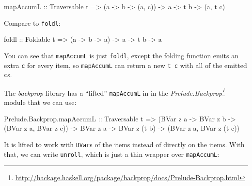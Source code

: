 \documentclass[]{article}
\newenvironment{Shaded}{}{}
\newcommand{\DataTypeTok}[1]{\textcolor[rgb]{0.56,0.13,0.00}{#1}}
\newcommand{\NormalTok}[1]{#1}
\newcommand{\OtherTok}[1]{\textcolor[rgb]{0.00,0.44,0.13}{#1}}
\renewcommand{\href}[2]{#2\footnote{\url{#1}}}
\begin{document}
\begin{Shaded}
\begin{Highlighting}[]
\NormalTok{mapAccumL}
\OtherTok{    ::} \DataTypeTok{Traversable}\NormalTok{ t}
    \OtherTok{=>}\NormalTok{ (a }\OtherTok{->}\NormalTok{ b }\OtherTok{->}\NormalTok{ (a, c))}
    \OtherTok{->}\NormalTok{ a}
    \OtherTok{->}\NormalTok{ t b}
    \OtherTok{->}\NormalTok{ (a, t c)}
\end{Highlighting}
\end{Shaded}

Compare to \texttt{foldl}:

\begin{Shaded}
\begin{Highlighting}[]
\NormalTok{foldl}
\OtherTok{    ::} \DataTypeTok{Foldable}\NormalTok{ t}
    \OtherTok{=>}\NormalTok{ (a }\OtherTok{->}\NormalTok{ b }\OtherTok{->}\NormalTok{ a)}
    \OtherTok{->}\NormalTok{ a}
    \OtherTok{->}\NormalTok{ t b}
    \OtherTok{->}\NormalTok{ a}
\end{Highlighting}
\end{Shaded}

You can see that \texttt{mapAccumL} is just \texttt{foldl}, except the folding
function emits an extra \texttt{c} for every item, so \texttt{mapAccumL} can
return a new \texttt{t\ c} with all of the emitted \texttt{c}s.

The \emph{backprop} library has a ``lifted'' \texttt{mapAccumL} in in the
\emph{\href{http://hackage.haskell.org/package/backprop/docs/Prelude-Backprop.html}{Prelude.Backprop}}
module that we can use:

\begin{Shaded}
\begin{Highlighting}[]
\NormalTok{Prelude.Backprop.mapAccumL}
\OtherTok{    ::} \DataTypeTok{Traversable}\NormalTok{ t}
    \OtherTok{=>}\NormalTok{ (}\DataTypeTok{BVar}\NormalTok{ z a }\OtherTok{->} \DataTypeTok{BVar}\NormalTok{ z b }\OtherTok{->}\NormalTok{ (}\DataTypeTok{BVar}\NormalTok{ z a, }\DataTypeTok{BVar}\NormalTok{ z c))}
    \OtherTok{->} \DataTypeTok{BVar}\NormalTok{ z a}
    \OtherTok{->} \DataTypeTok{BVar}\NormalTok{ z (t b)}
    \OtherTok{->}\NormalTok{ (}\DataTypeTok{BVar}\NormalTok{ z a, }\DataTypeTok{BVar}\NormalTok{ z (t c))}
\end{Highlighting}
\end{Shaded}

It is lifted to work with \texttt{BVar}s of the items instead of directly on the
items. With that, we can write \texttt{unroll}, which is just a thin wrapper
over \texttt{mapAccumL}:
\end{document}
